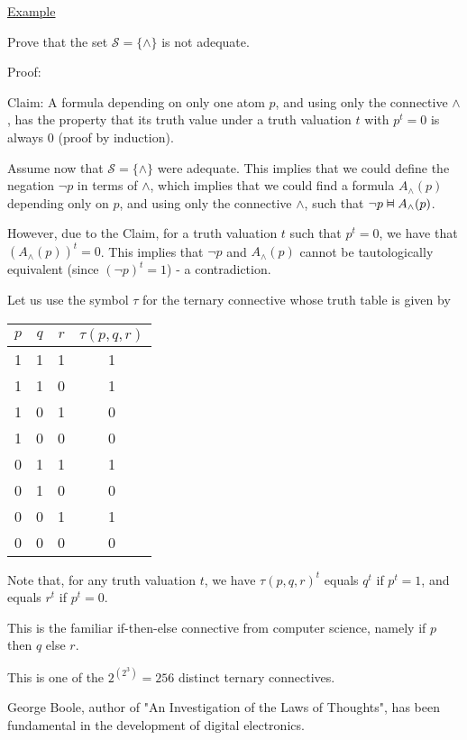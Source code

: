 \documentclass{article}
\newcommand{\vDashv}{%
  \mathrel{%
    \text{%
      \ooalign{$\vDash$\cr\reflectbox{$\vDash$}\cr}%
    }%
  }%
}
\begin{document}
\underline{Example}

Prove that the set $\mathcal{S} = \{\wedge\}$ is not adequate.

Proof:

Claim: A formula depending on only one atom $p$, and using only the connective $\wedge$, has the property that its truth value under a truth valuation $t$ with $p^t = 0$ is always $0$ (proof by induction).

Assume now that $\mathcal{S} = \{\wedge\}$ were adequate. This implies that we could define the negation $\neg p$ in terms of $\wedge$, which implies that we could find a formula $A_{\wedge}(p)$ depending only on $p$, and using only the connective $\wedge$, such that $\neg p \vDashv A_{\wedge}(p)$.

However, due to the Claim, for a truth valuation $t$ such that $p^t = 0$, we have that $(A_{\wedge}(p))^t = 0$. This implies that $\neg p$ and $A_{\wedge}(p)$ cannot be tautologically equivalent (since $(\neg p)^t = 1$) - a contradiction. 

Let us use the symbol $\tau$ for the ternary connective whose truth table is given by


\begin{table}[h]
    \centering
    \begin{tabular}{|c|c|c|c|} \hline
        $p$ & $q$ & $r$ & $\tau(p,q,r)$\\\hline
         1&  1&  1& 1\\
         1&  1&  0& 1\\
         1&  0&  1& 0\\
         1&  0&  0& 0\\
         0&  1&  1& 1\\
         0&  1&  0& 0\\
         0&  0&  1& 1\\
         0&  0&  0& 0\\\hline
    \end{tabular}
\end{table}

Note that, for any truth valuation $t$, we have $\tau(p,q,r)^t$ equals $q^t$ if $p^t = 1$, and equals $r^t$ if $p^t = 0$.

This is the familiar if-then-else connective from computer science, namely if $p$ then $q$ else $r$. 

This is one of the $2^{(2^3)} = 256$ distinct ternary connectives.

George Boole, author of "An Investigation of the Laws of Thoughts", has been fundamental in the development of digital electronics.
\end{document}
